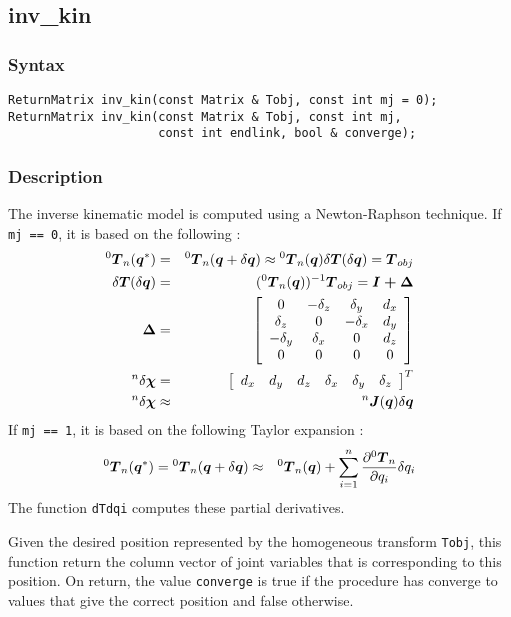 \documentclass[dvips,11pt,fleqn]{report}
\newcommand{\mbold}[1]{\mbox{\boldmath $ #1 $}}
\newcommand{\matr}[2]{\left[\begin{array}{#1} #2 \end{array}\right]}
\newcommand{\dfdx}[2]{\frac{\partial #1}{\partial #2}}
\begin{document}
\newpage

\subsection*{inv\_kin}
\subsubsection*{Syntax}
\begin{verbatim}
ReturnMatrix inv_kin(const Matrix & Tobj, const int mj = 0);
ReturnMatrix inv_kin(const Matrix & Tobj, const int mj, 
                     const int endlink, bool & converge);
\end{verbatim}
\subsubsection*{Description}
The inverse kinematic model is computed using a Newton-Raphson technique. 
If {\tt mj == 0}, it is based on the following \cite{Gorla84}:
\begin{eqnarray}
{}^0 \mbold{T}_n (\mbold{q}^*) & = & {}^0 \mbold{T}_n (\mbold{q} + \delta \mbold{q})
\approx {}^0 \mbold{T}_n (\mbold{q}) \delta \mbold{T} ( \delta \mbold{q}) =  \mbold{T}_{obj} \\
\delta \mbold{T} ( \delta \mbold{q}) & = & ({}^0 \mbold{T}_n (\mbold{q}))^{-1} \mbold{T}_{obj} = 
\mbold{I + \Delta} \\
\mbold{\Delta} & = & \matr{cccc}{
0 & -\delta_z & \delta_y & d_x \\
\delta_z & 0 & -\delta_x & d_y \\
-\delta_y & \delta_x & 0 & d_z \\
0 & 0 & 0 & 0} \\
{}^n \delta \mbold{\chi} & = & \matr{cccccc}{
d_x & d_y & d_z & \delta_x & \delta_y & \delta_z 
}^T \\
{}^n \delta \mbold{\chi} & \approx & {}^n \mbold{J}(\mbold{q}) \delta \mbold{q}
\end{eqnarray}
If {\tt mj == 1}, it is based on 
the following Taylor expansion \cite{Gorla84,Uicker67}:
\begin{eqnarray}
{}^0 \mbold{T}_n (\mbold{q}^*) & = {}^0 \mbold{T}_n (\mbold{q} + \delta \mbold{q}) \approx & 
{}^0 \mbold{T}_n (\mbold{q}) + \sum_{i=1}^{n} \dfdx{{}^0 \mbold{T}_n}{q_i} \delta q_i
\end{eqnarray}
The function {\tt dTdqi} computes these partial derivatives.

Given the desired position represented by the homogeneous transform
{\tt Tobj}, this function return the column vector of joint variables
that is corresponding to this position. On return, the value
\texttt{converge} is true if the procedure has converge to values that
give the correct position and false otherwise.
\end{document}
